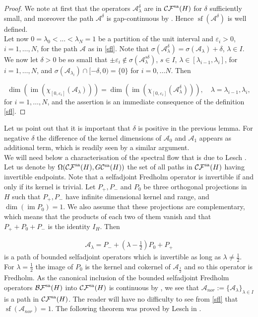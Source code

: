 \documentclass[a4paper,10pt]{article}
\DeclareMathOperator{\im}{im}
\DeclareMathOperator{\sfl}{sf}
\begin{document}
\begin{proof}
We note at first that the operators $\mathcal{A}^\delta_\lambda$ are in $\mathcal{CF}^\textup{sa}(H)$ for $\delta$ sufficiently small, and moreover the path $\mathcal{A}^\delta$ is gap-continuous by \cite[Thm. IV.2.17]{Kato}. Hence $\sfl(\mathcal{A}^\delta)$ is well defined.\\ 
Let now $0=\lambda_0<\ldots<\lambda_N=1$ be a partition of the unit interval and $\varepsilon_i>0$, $i=1,\ldots,N$, for the path $\mathcal{A}$ as in \eqref{sfl}. Note that $\sigma(\mathcal{A}^\delta_\lambda)=\sigma(\mathcal{A}_\lambda)+\delta$, $\lambda\in I$. We now let $\delta>0$ be so small that $\pm\varepsilon_i\notin\sigma(\mathcal{A}^{s\delta}_\lambda)$, $s\in I$, $\lambda\in[\lambda_{i-1},\lambda_i]$, for $i=1,\ldots,N$, and $\sigma(\mathcal{A}_{\lambda_i})\cap[-\delta,0)=\{0\}$ for $i=0,\ldots N$. Then

\[\dim(\im(\chi_{[0,\varepsilon_i]}(\mathcal{A}_{\lambda})))=\dim(\im(\chi_{[0,\varepsilon_i]}(\mathcal{A}^\delta_{\lambda}))),\quad \lambda=\lambda_{i-1},\lambda_i,\]
for $i=1,\ldots,N$, and the assertion is an immediate consequence of the definition \eqref{sfl}. 
\end{proof}
\noindent
Let us point out that it is important that $\delta$ is positive in the previous lemma. For negative $\delta$ the difference of the kernel dimensions of $\mathcal{A}_0$ and $\mathcal{A}_1$ appears as additional term, which is readily seen by a similar argument.\\
We will need below a characterisation of the spectral flow that is due to Lesch \cite{Lesch}. Let us denote by $\Omega(\mathcal{CF}^\textup{sa}(H),G\mathcal{C}^\textup{sa}(H))$ the set of all paths in $\mathcal{CF}^\textup{sa}(H)$ having invertible endpoints. Note that a selfadjoint Fredholm operator is invertible if and only if its kernel is trivial. Let $P_+,P_-$ and $P_0$ be three orthogonal projections in $H$ such that $P_+,P_-$ have infinite dimensional kernel and range, and $\dim(\im P_0)=1$. We also assume that these projections are complementary, which means that the products of each two of them vanish and that $P_++P_0+P_-$ is the identity $I_H$. Then 

\begin{align}\label{normalisationpath}
\mathcal{A}_\lambda=P_-+(\lambda-\frac{1}{2})P_0+P_+
\end{align}
is a path of bounded selfadjoint operators which is invertible as long as $\lambda\neq\frac{1}{2}$. For $\lambda=\frac{1}{2}$ the image of $P_0$ is the kernel and cokernel of $\mathcal{A}_{\frac{1}{2}}$ and so this operator is Fredholm. As the canonical inclusion of the bounded selfadjoint Fredholm operators $\mathcal{BF}^\textup{sa}(H)$ into $\mathcal{CF}^\textup{sa}(H)$ is continuous by \cite[Prop. 2.2]{Lesch}, we see that $\mathcal{A}_{nor}:=\{\mathcal{A}_\lambda\}_{\lambda\in I}$ is a path in $\mathcal{CF}^\textup{sa}(H)$. The reader will have no difficulty to see from \eqref{sfl} that $\sfl(\mathcal{A}_{nor})=1$. The following theorem was proved by Lesch in \cite{Lesch}. 
\end{document}
